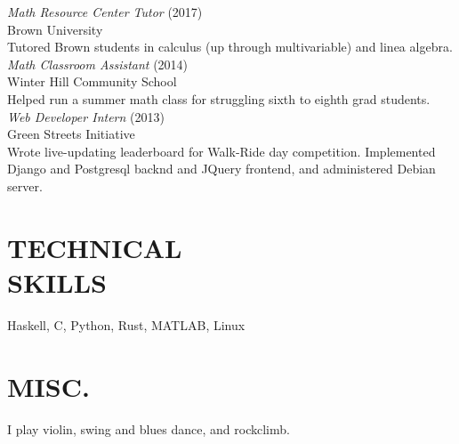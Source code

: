\documentclass[line,margin]{res}
\begin{document}
\begin{resume}
                {\sl Math Resource Center Tutor} \hfill            (2017) \\
                Brown University \\
                Tutored Brown students in calculus (up through multivariable) and linea algebra. \\

                {\sl Math Classroom Assistant} \hfill        (2014) \\
                Winter Hill Community School \\
                Helped run a summer math class for struggling sixth to eighth grad students. \\

                {\sl Web Developer Intern} \hfill (2013) \\
                Green Streets Initiative \\
                Wrote live-updating leaderboard for Walk-Ride day competition. Implemented Django and Postgresql backnd and JQuery frontend, and administered Debian server. \\

\section{TECHNICAL \\ SKILLS} Haskell, C, Python, Rust, MATLAB, Linux
 
\section{MISC.} I play violin, swing and blues dance, and rockclimb.

\end{resume}
\end{document}
